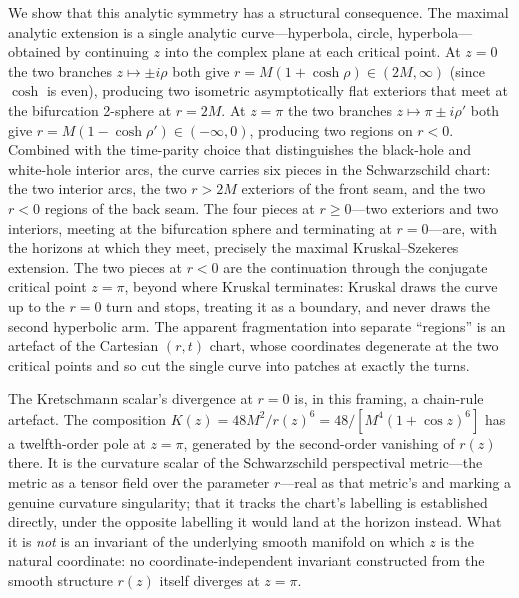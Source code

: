 \documentclass[11pt,a4paper]{article}
\theoremstyle{definition}
\begin{document}
We show that this analytic symmetry has a structural consequence. The maximal analytic extension is a single analytic curve---hyperbola, circle, hyperbola---obtained by continuing $z$ into the complex plane at each critical point. At $z=0$ the two branches $z \mapsto \pm i\rho$ both give $r = M(1+\cosh\rho) \in (2M,\infty)$ (since $\cosh$ is even), producing two isometric asymptotically flat exteriors that meet at the bifurcation 2-sphere at $r=2M$. At $z=\pi$ the two branches $z \mapsto \pi \pm i\rho'$ both give $r = M(1-\cosh\rho') \in (-\infty,0)$, producing two regions on $r<0$. Combined with the time-parity choice that distinguishes the black-hole and white-hole interior arcs, the curve carries six pieces in the Schwarzschild chart: the two interior arcs, the two $r>2M$ exteriors of the front seam, and the two $r<0$ regions of the back seam. The four pieces at $r \geq 0$---two exteriors and two interiors, meeting at the bifurcation sphere and terminating at $r=0$---are, with the horizons at which they meet, precisely the maximal Kruskal--Szekeres extension. The two pieces at $r<0$ are the continuation through the conjugate critical point $z=\pi$, beyond where Kruskal terminates: Kruskal draws the curve up to the $r=0$ turn and stops, treating it as a boundary, and never draws the second hyperbolic arm. The apparent fragmentation into separate ``regions'' is an artefact of the Cartesian $(r,t)$ chart, whose coordinates degenerate at the two critical points and so cut the single curve into patches at exactly the turns.

The Kretschmann scalar's divergence at $r=0$ is, in this framing, a chain-rule artefact. The composition $K(z) = 48M^2/r(z)^6 = 48/[M^4(1+\cos z)^6]$ has a twelfth-order pole at $z=\pi$, generated by the second-order vanishing of $r(z)$ there. It is the curvature scalar of the Schwarzschild perspectival metric---the metric as a tensor field over the parameter $r$---real as that metric's and marking a genuine curvature singularity; that it tracks the chart's labelling is established directly, under the opposite labelling it would land at the horizon instead. What it is \emph{not} is an invariant of the underlying smooth manifold on which $z$ is the natural coordinate: no coordinate-independent invariant constructed from the smooth structure $r(z)$ itself diverges at $z=\pi$.
\end{document}
